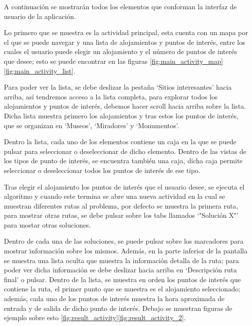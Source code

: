 A continuación se mostrarán todos los elementos que conforman la interfaz de usuario de la aplicación.\newline

Lo primero que se muestra es la actividad principal, esta cuenta con un mapa por el que se puede navegar y una lista de alojamientos y puntos de interés, entre los cuales el usuario puede elegir un alojamiento y el número de puntos de interés que desee; esto se puede encontrar en las figuras \ref{fig:main_activity_map}\ref{fig:main_activity_list}.\newline

Para poder ver la lista, se debe deslizar la pestaña \enquote*{Sitios interesantes} hacia arriba, así tendremos acceso a la lista completa, para explorar todos los alojamientos y puntos de interés, debemos hacer scroll hacia arriba sobre la lista. Dicha lista muestra primero los alojamientos y tras estos los puntos de interés, que se organizan en \enquote*{Museos}, \enquote*{Miradores} y \enquote*{Monumentos}.\newline

Dentro la lista, cada uno de los elementos contiene un caja en la que se puede pulsar para seleccionar o deseleccionar de dicho elemento. Dentro de las vistas de los tipos de punto de interés, se encuentra también una caja, dicha caja permite seleccionar o deseleccionar todos los puntos de interés de ese tipo.\newline

Tras elegir el alojamiento los puntos de interés que el usuario desee, se ejecuta el algoritmo y cuando este termina se abre una nueva actividad en la cual se muestran diferentes rutas al problema, por defecto se muestra la primera ruta, para mostrar otras rutas, se debe pulsar sobre los tabs llamados \enquote*{"Solución X"} para mostar otras soluciones.\newline

Dentro de cada una de las soluciones, se puede pulsar sobre los marcadores para mostrar información sobre los mismos. Además, en la parte inferior de la pantalla se muestra una lista oculta que muestra la información detalla de la ruta; para poder ver dicha información se debe deslizar hacia arriba en \enquote*{Descripción ruta final} o pulsar. Dentro de la lista, se muestra en orden los puntos de interés que contiene la ruta, el primer punto que se muestra es el alojamiento seleccionado; además, cada uno de los puntos de interés muestra la hora aproximada de entrada y de salida de dicho punto de interés. Debajo se muestran figuras de ejemplo sobre esto \ref{fig:result_activity}\ref{fig:result_activity_2}.


